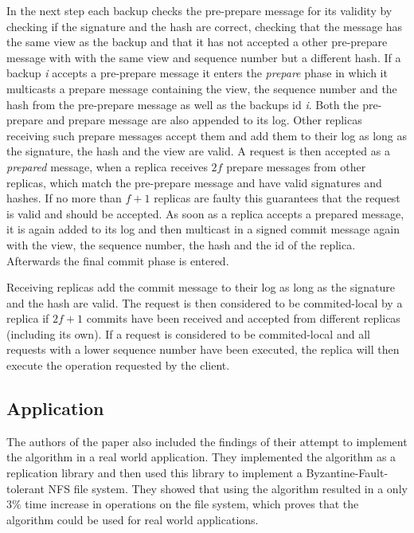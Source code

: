 In the next step each backup checks the pre-prepare message for its validity by checking if the signature and the hash are correct, checking that the message has the same view as the backup and
that it has not accepted a other pre-prepare message with with the same view and sequence number but a different hash. If a backup \textit{i} accepts a pre-prepare message it enters the \textit{prepare}
phase in which it multicasts a prepare message containing the view, the sequence number and the hash from the pre-prepare message as well as the backups id \textit{i}. Both the pre-prepare and
prepare message are also appended to its log. Other replicas receiving such prepare messages accept them and add them to their log as long as the signature, the hash and the view are
valid. A request is then accepted as a \textit{prepared} message, when a replica receives $2f$ prepare messages from other replicas, which match the pre-prepare message and have valid signatures
and hashes. If no more than $f+1$ replicas are faulty this guarantees that the request is valid and should be accepted. As soon as a replica accepts a prepared message, it is again added to its log
and then multicast in a signed commit message again with the view, the sequence number, the hash and the id of the replica. Afterwards the final commit phase is entered.

Receiving replicas add the commit
message to their log as long as the signature and the hash are valid. The request is then considered to be commited-local by a replica if $2f+1$ commits have been received and accepted from
different replicas (including its own). If a request is considered to be commited-local and all requests with a lower sequence number have been executed, the replica will then execute the operation
requested by the client.

\subsection{Application}

The authors of the paper also included the findings of their attempt to implement the algorithm in a real world application. They implemented the algorithm as a replication library and then used this
library to implement a Byzantine-Fault-tolerant NFS file system. They showed that using the algorithm resulted in a only 3\% time increase in operations on the file system, which proves
that the algorithm could be used for real world applications. 
